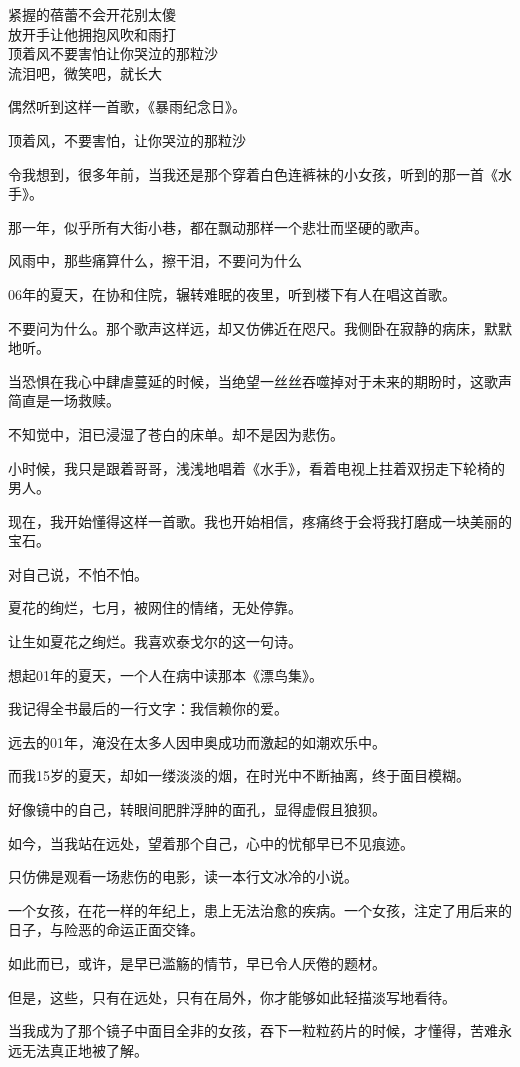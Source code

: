 		\longpoem{}{}{}
			紧握的蓓蕾不会开花别太傻 \\
			放开手让他拥抱风吹和雨打 \\
			顶着风不要害怕让你哭泣的那粒沙 \\
			流泪吧，微笑吧，就长大
		\endlongpoem

		偶然听到这样一首歌，《暴雨纪念日》。

		\longpoem{}{}{}
			顶着风，不要害怕，让你哭泣的那粒沙
		\endlongpoem

		令我想到，很多年前，当我还是那个穿着白色连裤袜的小女孩，听到的那一首《水手》。

		那一年，似乎所有大街小巷，都在飘动那样一个悲壮而坚硬的歌声。

		\longpoem{}{}{}
			风雨中，那些痛算什么，擦干泪，不要问为什么
		\endlongpoem

		06年的夏天，在协和住院，辗转难眠的夜里，听到楼下有人在唱这首歌。

		不要问为什么。那个歌声这样远，却又仿佛近在咫尺。我侧卧在寂静的病床，默默地听。

		当恐惧在我心中肆虐蔓延的时候，当绝望一丝丝吞噬掉对于未来的期盼时，这歌声简直是一场救赎。

		不知觉中，泪已浸湿了苍白的床单。却不是因为悲伤。

		小时候，我只是跟着哥哥，浅浅地唱着《水手》，看着电视上拄着双拐走下轮椅的男人。

		现在，我开始懂得这样一首歌。我也开始相信，疼痛终于会将我打磨成一块美丽的宝石。

		对自己说，不怕不怕。

	\endwriting



		夏花的绚烂，七月，被网住的情绪，无处停靠。

		\vspace{1em}
		让生如夏花之绚烂。我喜欢泰戈尔的这一句诗。\par
		想起01年的夏天，一个人在病中读那本《漂鸟集》。\par
		我记得全书最后的一行文字：我信赖你的爱。

		远去的01年，淹没在太多人因申奥成功而激起的如潮欢乐中。\par
		而我15岁的夏天，却如一缕淡淡的烟，在时光中不断抽离，终于面目模糊。\par
		好像镜中的自己，转眼间肥胖浮肿的面孔，显得虚假且狼狈。

		如今，当我站在远处，望着那个自己，心中的忧郁早已不见痕迹。\par
		只仿佛是观看一场悲伤的电影，读一本行文冰冷的小说。\par
		一个女孩，在花一样的年纪上，患上无法治愈的疾病。一个女孩，注定了用后来的日子，与险恶的命运正面交锋。\par
		如此而已，或许，是早已滥觞的情节，早已令人厌倦的题材。\par
		但是，这些，只有在远处，只有在局外，你才能够如此轻描淡写地看待。\par
		当我成为了那个镜子中面目全非的女孩，吞下一粒粒药片的时候，才懂得，苦难永远无法真正地被了解。

